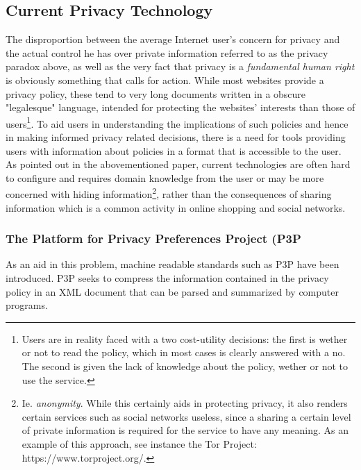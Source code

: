 \subsection{Current Privacy Technology}\label{privTech}
The disproportion between the average Internet user's concern for privacy and the actual control he has over private information referred to as the privacy paradox above, as well as the very fact that privacy is a \emph{fundamental human right} is obviously something that calls for action. While most websites provide a privacy policy, these tend to very long documents written in a obscure "legalesque" language, intended  for protecting the websites' interests than those of users\footnote{Users are in reality faced with a two cost-utility decisions: the first is wether or not to read the policy, which in most cases is clearly answered with a no. The second is given the lack of knowledge about the policy, wether or not to use the service.}. To aid users in understanding the implications of such policies and hence in making informed privacy related decisions, there is a need for tools providing users with information about policies in a format that is accessible to the user. As pointed out in the abovementioned paper, current technologies are often hard to configure and requires domain knowledge from the user or may be more concerned with hiding information\footnote{Ie. \emph{anonymity}. While this certainly aids in protecting privacy, it also renders certain services such as social networks useless, since a sharing a certain level of private information is required for the service to have any meaning. As an example of this approach, see instance the Tor Project: https://www.torproject.org/.}, rather than the consequences of sharing information which is a common activity in online shopping and social networks.

\subsubsection{The Platform for Privacy Preferences Project (P3P}
As an aid in this problem, machine readable standards such as P3P have been introduced. P3P seeks to compress the information contained in the privacy policy in an XML document that can be parsed and summarized by computer programs. 

